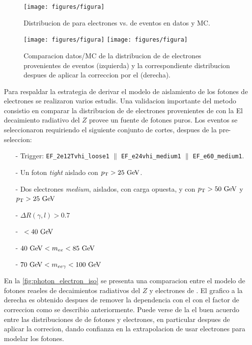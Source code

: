 \begin{figure}[h]
  \centering
  \texttt{[image: figures/figura]}
  \caption{Distribucion de {\etiso} para electrones vs. {\pt} de eventos {\Zee} en datos y MC.}
  \label{fig:isolation_vs_pt}
\end{figure}

\begin{figure}[h]
  \centering
  \texttt{[image: figures/figura]}
  \texttt{[image: figures/figura]}
  \caption{Comparacion datos/MC de la distribucion de {\etiso} de electrones provenientes de
    eventos {\Zee} (izquierda) y la correspondiente distribucion despues de aplicar la correccion
    por el {\pt} (derecha).}
  \label{fig:isolation_wandwo_correction}
\end{figure}

Para respaldar la estrategia de derivar el modelo de aislamiento de los fotones de
electrones se realizaron varios estudis. Una validacion importante del metodo consistio
en comparar la distribucion de {\etiso} de electrones provenientes de {\Zee} con la
El decaimiento radiativo del $Z$ provee un fuente de fotones puros. Los eventos se
seleccionaron requiriendo el siguiente conjunto de cortes, despues de la pre-seleccion:

\begin{itemize}\itemsep0.1cm
\item[-] Trigger: \texttt{EF\_2e12Tvhi\_loose1} $\parallel$ \texttt{EF\_e24vhi\_medium1} $\parallel$ \texttt{EF\_e60\_medium1}.
\item[-] Un foton \emph{tight} aislado con $\pt>25 \gev$.
\item[-] Dos electrones \emph{medium}, aislados, con carga opuesta, y con $\pt>50 \gev$ y $\pt>25 \gev$
\item[-] $\Delta R(\gamma,l)>0.7$
\item[-] \MET\ $<40\gev$
\item[-] $40\gev<m_{ee}<85\gev$
\item[-] $70\gev<m_{ee\gamma}<100\gev$
\end{itemize}

En la {\fig} \ref{fig:photon_electron_iso} se presenta una comparacion entre
el modelo de fotones reaeles de decaimientos radiativos del $Z$ y electrones
de {\Zee}. El grafico a la derecha es obtenido despues de remover la dependencia
con el {\pt} con el factor de correccion como se describio anteriormente.
Puede verse de la {\fig} el buen acuerdo entre las distribuciones de {\etiso}
de fotones y electrones, en particular despues de aplicar la correcion, dando
confianza en la extrapolacion de usar electrones para modelar los fotones.

